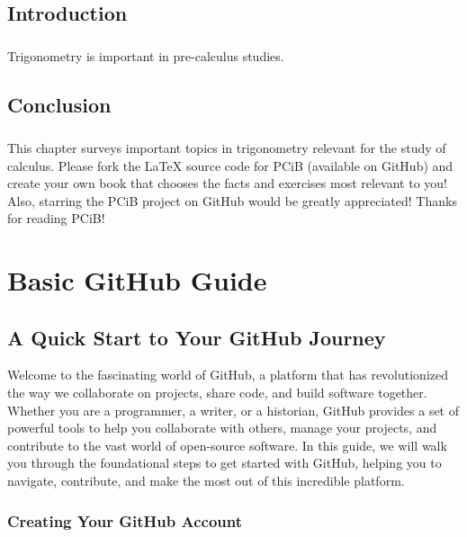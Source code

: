 \documentclass[a4paper,12pt]{book}
\begin{document}
\section*{Introduction}
\paragraph{}
Trigonometry is important in pre-calculus studies.

\section*{Conclusion}
\paragraph{}
This chapter surveys important topics in trigonometry relevant for the study of calculus. Please fork the LaTeX source code for PCiB (available on GitHub) and create your own book that chooses the facts and exercises most relevant to you! Also, starring the PCiB project on GitHub would be greatly appreciated! Thanks for reading PCiB!



\clearpage
{}
\appendix
\renewcommand{\thechapter}{\Roman{chapter}} %

\chapter{Basic GitHub Guide}
\section*{A Quick Start to Your GitHub Journey}

Welcome to the fascinating world of GitHub, a platform that has revolutionized the way we collaborate on projects, share code, and build software together. Whether you are a programmer, a writer, or a historian, GitHub provides a set of powerful tools to help you collaborate with others, manage your projects, and contribute to the vast world of open-source software. In this guide, we will walk you through the foundational steps to get started with GitHub, helping you to navigate, contribute, and make the most out of this incredible platform.

\subsection*{Creating Your GitHub Account}
\end{document}
